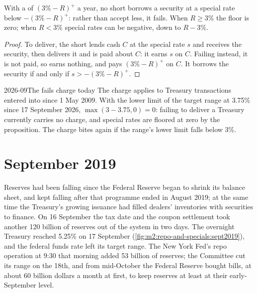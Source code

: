 \begin{proposition}\label{prop:m2:repo-and-specials:floor}
With a  of $(3\% - R)^+$ a year, no short borrows a security at a
special rate below $-(3\% - R)^+$: rather than accept less, it fails. When
$R \ge 3\%$ the floor is zero; when $R < 3\%$ special rates can be negative,
down to $R - 3\%$.
\end{proposition}
\begin{proof}
To deliver, the short lends cash $C$ at the special rate $s$ and receives the
security, then delivers it and is paid about $C$: it earns $s$ on $C$. Failing
instead, it is not paid, so earns nothing, and pays $(3\% - R)^+$ on $C$. It
borrows the security if and only if $s > -(3\% - R)^+$.
\end{proof}

\begin{dated}{2026-09}{The fails charge today}\label{dat:m2:repo-and-specials:fails}
The charge applies to Treasury transactions entered into since 1 May 2009.
With the lower limit of the target range at 3.75\% since 17 September 2026,
$\max(3 - 3.75, 0) = 0$: failing to deliver a Treasury currently carries no
charge, and special rates are floored at zero by the proposition. The charge
bites again if the range's lower limit falls below 3\%.
\end{dated}

\section{September 2019}

Reserves had been falling since the Federal Reserve began to shrink its
balance sheet, and kept falling after that programme ended in August 2019;
at the same time the Treasury's growing issuance had filled dealers'
inventories with securities to finance. On 16 September the tax date and the coupon settlement took
another 120 billion of reserves out of the system in two days. The overnight
Treasury  reached 5.25\% on 17 September
(\cref{fig:m2:repo-and-specials:sept2019}), and the federal funds rate left
its target range. The New York Fed's repo operation at 9:30 that morning
added 53 billion of reserves; the Committee cut its range on the 18th, and
from mid-October the Federal Reserve bought bills, at about 60 billion dollars
a month at first, to keep reserves at least at their early-September level.

